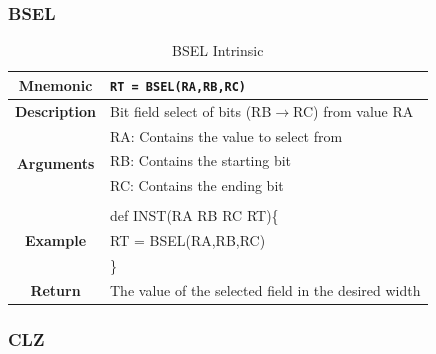 \documentclass{article}
\begin{document}
\subsubsection{BSEL}
\label{sec:BSEL}

\begin{table}[h]
\begin{center}
\caption{BSEL Intrinsic}
\vspace{0.125in}
\label{tab:BSELIntrinsic}
\begin{tabular}{|c|l|}
\hline
\textbf{Mnemonic} & \texttt{RT = BSEL(RA,RB,RC)}\\
\hline
\textbf{Description} & Bit field select of bits (RB$\rightarrow$RC) from value RA\\
\hline
\multirow{4}{*}{\textbf{Arguments}} & RA: Contains the value to select from\\
                                    & RB: Contains the starting bit\\
                                    & RC: Contains the ending bit\\
                          			     & \\
\hline
\multirow{3}{*}{\textbf{Example}} & def INST(RA RB RC RT)\{\\
                          			  &   RT = BSEL(RA,RB,RC)\\
                                                    & \}\\
\hline
\textbf{Return} & The value of the selected field in the desired width\\
\hline
\end{tabular}
\end{center}
\end{table}

\clearpage
\subsubsection{CLZ}
\label{sec:CLZ}
\end{document}
